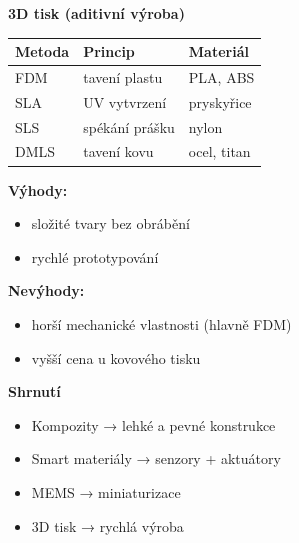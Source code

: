 \documentclass[a4paper,10pt]{article}
\begin{document}
\begin{vysvetlenibox}
\textbf{3D tisk (aditivní výroba)}

\begin{center}
\begin{tabularx}{0.95\linewidth}{l X l}
Metoda & Princip & Materiál \\
\hline
FDM  & tavení plastu & PLA, ABS \\
SLA  & UV vytvrzení & pryskyřice \\
SLS  & spékání prášku & nylon \\
DMLS & tavení kovu & ocel, titan \\
\end{tabularx}
\end{center}

\textbf{Výhody:}
\begin{itemize}
\item složité tvary bez obrábění
\item rychlé prototypování
\end{itemize}

\textbf{Nevýhody:}
\begin{itemize}
\item horší mechanické vlastnosti (hlavně FDM)
\item vyšší cena u kovového tisku
\end{itemize}

\textbf{Shrnutí}

\begin{itemize}
\item Kompozity → lehké a pevné konstrukce
\item Smart materiály → senzory + aktuátory
\item MEMS → miniaturizace
\item 3D tisk → rychlá výroba
\end{itemize}

\end{vysvetlenibox}
\end{document}
